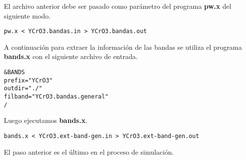 \noindent El archivo anterior debe ser pasado como par\'ametro del programa \textbf{pw.x} del siguiente modo.

\begin{lstlisting}
pw.x < YCrO3.bandas.in > YCrO3.bandas.out
\end{lstlisting}

\noindent A continuaci\'on para extraer la informaci\'on de las bandas se utiliza el programa \textbf{bands.x} con el siguiente archivo de entrada.

\begin{lstlisting}
&BANDS
prefix="YCrO3"
outdir="./"
filband="YCrO3.bandas.general"
/
\end{lstlisting}

\noindent Luego ejecutamos \textbf{bands.x}.

\begin{lstlisting}
bands.x < YCrO3.ext-band-gen.in > YCrO3.ext-band-gen.out
\end{lstlisting}

\noindent El paso anterior es el \'ultimo en el proceso de simulaci\'on.